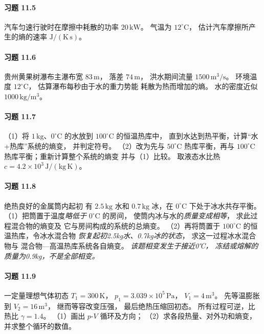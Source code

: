 \paragraph{习题 11.5}
汽车匀速行驶时在摩擦中耗散的功率
\(20\,\mathrm{kW}\)。
气温为 \(12^\circ\mathrm C\)，
估计汽车摩擦所产生的熵的速率
\(\mathrm{J/(K\,s)}\)。

\paragraph{习题 11.6}
贵州黄果树瀑布主瀑布宽 \(83\,\mathrm m\)，
落差 \(74\,\mathrm m\)，
洪水期间流量
\(1500\,\mathrm{m^3/s}\)。
环境温度 \(12^\circ\mathrm C\)，
估算瀑布每秒由于水的重力势能
耗散为热而增加的熵。
水的密度近似 \(1000\,\mathrm{kg/m^3}\)。

\paragraph{习题 11.7}
（1）将 \(1\,\mathrm{kg}\)、\(0^\circ\mathrm C\)
的水放到 \(100^\circ\mathrm C\) 的恒温热库中，
直到水达到热平衡，计算“水+热库”系统的熵变，
并判定符号。
（2）改为先与 \(50^\circ\mathrm C\)
热库平衡，再与 \(100^\circ\mathrm C\)
热库平衡；重新计算整个系统的熵变
并与（1）比较。
取液态水比热 \(c=4.2\times10^3\,\mathrm{J/(kg\,K)}\)。

\paragraph{习题 11.8}
绝热良好的金属筒内起初
有 \(2.5\,\mathrm{kg}\) 水和
\(0.7\,\mathrm{kg}\) 冰，在 \(0^\circ\mathrm C\)
下处于冰水共存平衡。
（1）把筒置于温度\emph{略低于}
\(0^\circ\mathrm C\) 的房间，
使筒内冰与水的\emph{质量变成相等}，
求此过程混合物的熵变及
它与房间构成的系统的总熵变。
（2）再将筒置于 \(100^\circ\mathrm C\)
的恒温热库，令冰水混合物
\emph{恢复起初2.5kg水、0.7kg冰的状态}，
求这一过程冰水混合物与
混合物—高温热库系统各自熵变。
\textit{该题相变发生于接近0℃，
冻结或熔解的质量为0.9kg，不是全部相变。}

\paragraph{习题 11.9}
一定量理想气体初态
\(T_1=300\,\mathrm K\)，
\(p_1=3.039\times10^5\,\mathrm{Pa}\)，
\(V_1=4\,\mathrm{m^3}\)。
先等温膨胀到 \(V_2=16\,\mathrm{m^3}\)，
继而等容改变压强，
最后绝热压缩回初态。
所有过程可逆，比热比 \(\gamma=1.4\)。
（1）画出 \(p\)-\(V\) 循环及方向；
（2）求各段热量、对外功和熵变，
并求整个循环的数值。

